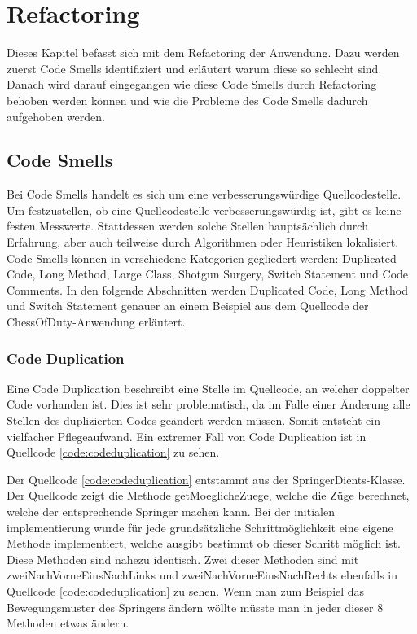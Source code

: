 \chapter{Refactoring}
Dieses Kapitel befasst sich mit dem Refactoring der Anwendung. Dazu werden zuerst Code Smells identifiziert und erläutert warum diese so schlecht sind. Danach wird darauf eingegangen wie diese Code Smells durch Refactoring behoben werden können und wie die Probleme des Code Smells dadurch aufgehoben werden.

\section{Code Smells}
Bei Code Smells handelt es sich um eine verbesserungswürdige Quellcodestelle. Um festzustellen, ob eine Quellcodestelle verbesserungswürdig ist, gibt es keine festen Messwerte. Stattdessen werden solche Stellen hauptsächlich durch Erfahrung, aber auch teilweise durch Algorithmen oder Heuristiken lokalisiert. Code Smells können in verschiedene Kategorien gegliedert werden: Duplicated Code, Long Method, Large Class, Shotgun Surgery, Switch Statement und Code Comments. In den folgende Abschnitten werden Duplicated Code, Long Method und Switch Statement genauer an einem Beispiel aus dem Quellcode der ChessOfDuty-Anwendung erläutert.

\subsection{Code Duplication}
Eine Code Duplication beschreibt eine Stelle im Quellcode, an welcher doppelter Code vorhanden ist. Dies ist sehr problematisch, da im Falle einer Änderung alle Stellen des duplizierten Codes geändert werden müssen. Somit entsteht ein vielfacher Pflegeaufwand. Ein extremer Fall von Code Duplication ist in Quellcode \ref{code:codeduplication} zu sehen.  


Der Quellcode \ref{code:codeduplication} entstammt aus der SpringerDients-Klasse. Der Quellcode zeigt die Methode getMoeglicheZuege, welche die Züge berechnet, welche der entsprechende Springer machen kann. Bei der initialen implementierung wurde für jede grundsätzliche Schrittmöglichkeit eine eigene Methode implementiert, welche ausgibt bestimmt ob dieser Schritt möglich ist. Diese Methoden sind nahezu identisch. Zwei dieser Methoden sind mit zweiNachVorneEinsNachLinks und zweiNachVorneEinsNachRechts ebenfalls in Quellcode \ref{code:codeduplication} zu sehen. Wenn man zum Beispiel das Bewegungsmuster des Springers ändern wöllte müsste man in jeder dieser 8 Methoden etwas ändern. 


